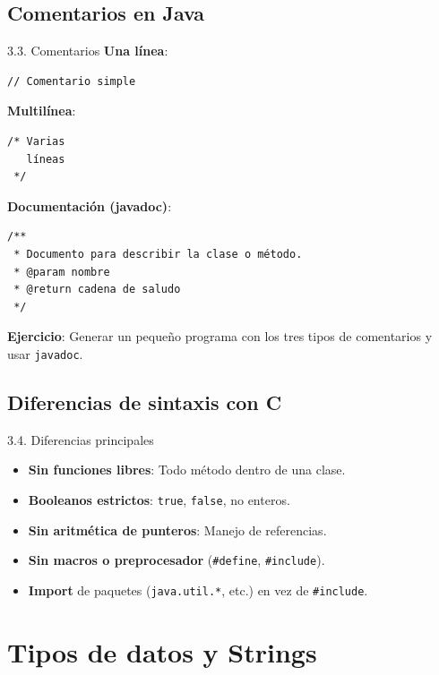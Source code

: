 \documentclass{beamer}
\begin{document}
\subsection{Comentarios en Java}

\begin{frame}[fragile]{3.3. Comentarios}
\textbf{Una línea}:
\begin{lstlisting}
// Comentario simple
\end{lstlisting}

\textbf{Multilínea}:
\begin{lstlisting}
/* Varias
   líneas
 */
\end{lstlisting}

\textbf{Documentación (javadoc)}:
\begin{lstlisting}
/**
 * Documento para describir la clase o método.
 * @param nombre
 * @return cadena de saludo
 */
\end{lstlisting}

\textbf{Ejercicio}:
Generar un pequeño programa con los tres tipos de comentarios y usar \texttt{javadoc}.
\end{frame}

\subsection{Diferencias de sintaxis con C}

\begin{frame}{3.4. Diferencias principales}
\begin{itemize}
  \item \textbf{Sin funciones libres}: Todo método dentro de una clase.
  \item \textbf{Booleanos estrictos}: \texttt{true}, \texttt{false}, no enteros.
  \item \textbf{Sin aritmética de punteros}: Manejo de referencias.
  \item \textbf{Sin macros o preprocesador} (\texttt{\#define}, \texttt{\#include}).
  \item \textbf{Import} de paquetes (\texttt{java.util.*}, etc.) en vez de \texttt{\#include}.
\end{itemize}

\end{frame}

\section{Tipos de datos y Strings}
\end{document}

